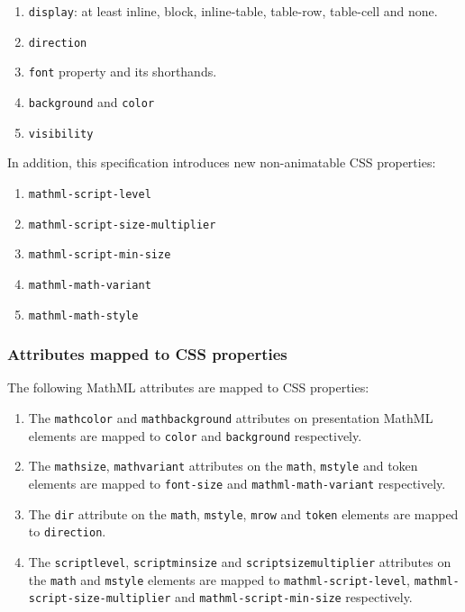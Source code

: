 \begin{enumerate}
\item {\tt display}: at least inline, block, inline-table, table-row,
  table-cell and none.
\item {\tt direction}
\item {\tt font} property and its shorthands.
\item {\tt background} and {\tt color}
\item {\tt visibility}
\end{enumerate}

In addition, this specification introduces new non-animatable CSS properties:

\begin{enumerate}
\item {\tt mathml-script-level}
\item {\tt mathml-script-size-multiplier}
\item {\tt mathml-script-min-size}
\item {\tt mathml-math-variant}
\item {\tt mathml-math-style}
\end{enumerate}

\subsubsection{Attributes mapped to CSS properties}\label{mappedAttributes}

The following MathML attributes are mapped to CSS properties:

\begin{enumerate}
\item The {\tt mathcolor} and {\tt mathbackground} attributes on presentation
  MathML elements are mapped to {\tt color} and {\tt background} respectively.
\item The {\tt mathsize}, {\tt mathvariant} attributes on the {\tt math},
  {\tt mstyle} and token elements are mapped to {\tt font-size} and
  {\tt mathml-math-variant} respectively.
\item The {\tt dir} attribute on the {\tt math}, {\tt mstyle}, {\tt mrow} and
  {\tt token} elements are mapped to {\tt direction}.
\item The {\tt scriptlevel}, {\tt scriptminsize} and {\tt scriptsizemultiplier}
  attributes on the {\tt math} and {\tt mstyle} elements are mapped to
  {\tt mathml-script-level}, {\tt mathml-script-size-multiplier}
  and {\tt mathml-script-min-size} respectively.
\end{enumerate}

